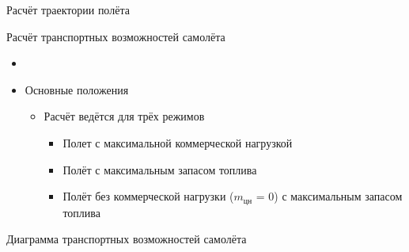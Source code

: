 \begin{frame}{Расчёт траектории полёта}
\end{frame}

\begin{frame}{Расчёт транспортных возможностей самолёта}
    \begin{itemize}
        \item <+-> []
        \item <+-> [] \begin{block}{Основные положения}
            \begin{itemize}
            \item <+-> [] Расчёт ведётся для трёх режимов
            \begin{itemize}
                \item <+-> Полет с максимальной коммерческой нагрузкой
                \item <+-> Полёт с максимальным запасом топлива
                \item <+-> Полёт без коммерческой нагрузки ($m_\text{цн}$ = 0) с максимальным запасом топлива
            \end{itemize}
        \end{itemize}
        \end{block}
    \end{itemize}
\end{frame}

\begin{frame}{Диаграмма транспортных возможностей самолёта}
\end{frame}